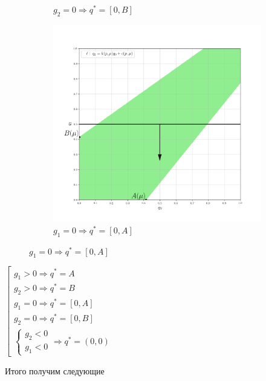 \begin{flushleft}
\begin{figure}[H]
\begin{subfigure}[b]{0.3 \textwidth}
        	\caption{$g_2 = 0 \Rightarrow q^*=[0,B]$}
     	\end{subfigure}
     	\begin{subfigure}[b]{0.3 \textwidth}
        	\centering
        	\includegraphics[width=\textwidth]{images/graf_3_8_4}
        	\caption{$g_1 = 0 \Rightarrow q^*=[0,A]$}
     	\end{subfigure}
	\end{figure}


	
	\begin{center}
		$\left[
		\begin{gathered}
			g_1 > 0 \Rightarrow q^*=A \\
			g_2 > 0 \Rightarrow q^*=B \\			
			g_1 = 0 \Rightarrow q^*=[0,A] \\
			g_2 = 0 \Rightarrow q^*=[0,B] \\			
			\begin{cases}			
				g_2 < 0 \\
				g_1 < 0
			\end{cases}	\Rightarrow q^*=(0,0)
		\end{gathered}
		\right.$	
	\end{center}


	Итого получим следующие 


\end{flushleft}
